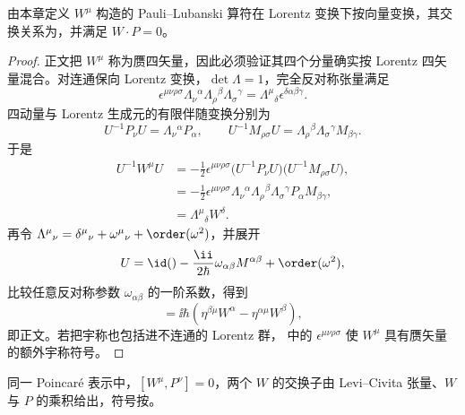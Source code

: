 \begin{proposition}
由本章定义 $W^\mu$ 构造的 Pauli--Lubanski 算符在 Lorentz 变换下按向量变换，其交换关系为，并满足 $W\cdot P=0$。
\end{proposition}

\begin{proof}
正文把 $W^\mu$ 称为赝四矢量，因此必须验证其四个分量确实按 Lorentz 四矢量混合。对连通保向 Lorentz 变换，$\det\Lambda=1$，完全反对称张量满足
\begin{equation*}
 \epsilon^{\mu\nu\rho\sigma}
 \Lambda_\nu{}^{\alpha}\Lambda_\rho{}^{\beta}\Lambda_\sigma{}^{\gamma}
 =\Lambda^\mu{}_{\delta}\epsilon^{\delta\alpha\beta\gamma}.
\end{equation*}
四动量与 Lorentz 生成元的有限伴随变换分别为
\begin{equation*}
 U^{-1}P_\nu U=\Lambda_\nu{}^{\alpha}P_\alpha,
 \qquad
 U^{-1}M_{\rho\sigma}U
 =\Lambda_\rho{}^{\beta}\Lambda_\sigma{}^{\gamma}M_{\beta\gamma}.
\end{equation*}
于是
\begin{align*}
 U^{-1}W^\mu U
 &=-\frac12\epsilon^{\mu\nu\rho\sigma}
 \bigl(U^{-1}P_\nu U\bigr)
 \bigl(U^{-1}M_{\rho\sigma}U\bigr),\\
 &=-\frac12\epsilon^{\mu\nu\rho\sigma}
 \Lambda_\nu{}^{\alpha}\Lambda_\rho{}^{\beta}\Lambda_\sigma{}^{\gamma}
 P_\alpha M_{\beta\gamma},\\
 &=\Lambda^\mu{}_{\delta}W^\delta.
\end{align*}
再令 $\Lambda^\mu{}_{\nu}=\delta^\mu{}_{\nu}+\omega^\mu{}_{\nu}+\order(\omega^2)$，并展开
\begin{equation*}
 U=\id()-\frac{\ii}{2\hbar}\omega_{\alpha\beta}M^{\alpha\beta}
 +\order(\omega^2),
\end{equation*}
比较任意反对称参数 $\omega_{\alpha\beta}$ 的一阶系数，得到
\begin{equation*}
 [M^{\alpha\beta},W^\mu]
 =\ii\hbar\left(\eta^{\beta\mu}W^\alpha-
 \eta^{\alpha\mu}W^\beta\right),
\end{equation*}
即正文。若把宇称也包括进不连通的 Lorentz 群， 中的 $\epsilon^{\mu\nu\rho\sigma}$ 使 $W^\mu$ 具有赝矢量的额外宇称符号。
\end{proof}

\begin{proposition}
同一 Poincaré 表示中，$[W^\mu,P^\nu]=0$，两个 $W$ 的交换子由 Levi--Civita 张量、$W$ 与 $P$ 的乘积给出，符号按。
\end{proposition}

